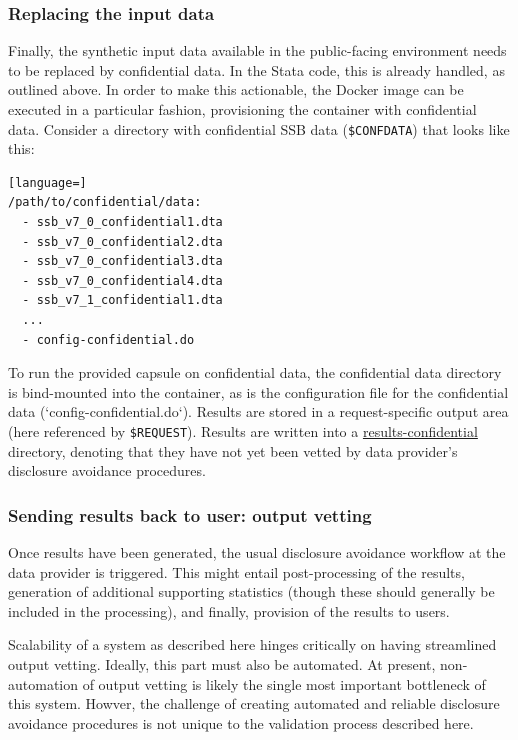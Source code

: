 \documentclass[]{hdsr}
\begin{document}
\subsubsection{Replacing the input data}

Finally, the synthetic input data available in the public-facing environment needs to be replaced by confidential data. In the Stata code, this is already handled, as outlined above. In order to make this actionable, the Docker image can be executed in a particular fashion, provisioning the container with confidential data. Consider a directory with confidential SSB data (\texttt{\$CONFDATA}) that looks like this:

\begin{lstlisting}[language=]
/path/to/confidential/data:
  - ssb_v7_0_confidential1.dta
  - ssb_v7_0_confidential2.dta
  - ssb_v7_0_confidential3.dta
  - ssb_v7_0_confidential4.dta
  - ssb_v7_1_confidential1.dta
  ...
  - config-confidential.do   
\end{lstlisting}

To run the provided capsule on confidential data, the confidential data directory is  bind-mounted into the container, as is the configuration file for the confidential data (`config-confidential.do`). Results are stored in a request-specific output area (here referenced by \texttt{\$REQUEST}). Results are written into a \url{results-confidential} directory, denoting that they have not yet been vetted by data provider's disclosure avoidance procedures.








\subsubsection{Sending results back to user: output vetting}

Once results have been generated, the usual disclosure avoidance workflow at the data provider is triggered. This might entail post-processing of the results, generation of additional supporting statistics (though these should generally be included in the processing), and finally, provision of the results to users. 

Scalability of a system as described here hinges critically on having streamlined output vetting. Ideally, this  part must also be automated. At present, non-automation of output vetting is likely the single most important bottleneck of this system. Howver, the challenge of creating automated and reliable disclosure avoidance procedures is  not unique to the validation process described here.
\end{document}
